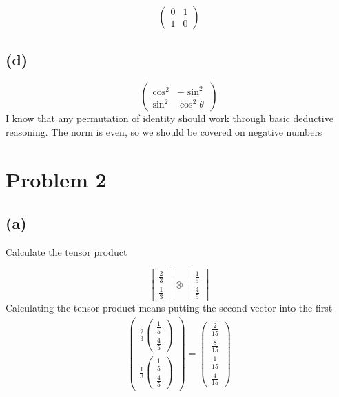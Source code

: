 \documentclass[]{article}
\begin{document}
\[
\begin{pmatrix}
0 & 1 \\
1 & 0
\end{pmatrix}
\]

\hypertarget{d}{%
\subsection{(d)}\label{d}}

\[
\begin{pmatrix}
\cos^{2} & -\sin^{2} \\
\sin^{2} & \cos^{2}\theta
\end{pmatrix}
\] I know that any permutation of identity should work through basic
deductive reasoning. The norm is even, so we should be covered on
negative numbers

\hypertarget{problem-2}{%
\section{Problem 2}\label{problem-2}}

\hypertarget{a-1}{%
\subsection{(a)}\label{a-1}}

Calculate the tensor product

\[
\begin{bmatrix}
\frac{2}{3} \\
\frac{1}{3}
\end{bmatrix}\otimes \begin{bmatrix}
\frac{1}{5} \\
\frac{4}{5}
\end{bmatrix}
\] Calculating the tensor product means putting the second vector into
the first \[
\begin{align}
\begin{pmatrix}
\frac{2}{3}\begin{pmatrix}
\frac{1}{5} \\
\frac{4}{5}
\end{pmatrix} \\
\frac{1}{3}\begin{pmatrix}
\frac{1}{5} \\
\frac{4}{5}
\end{pmatrix}
\end{pmatrix}=\begin{pmatrix}
\frac{2}{15} \\
\frac{8}{15} \\
\frac{1}{15} \\
\frac{4}{15}
\end{pmatrix}
\end{align}
\]
\end{document}
